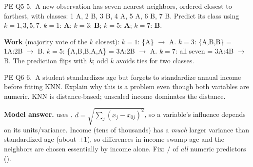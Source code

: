 \begin{qbox}{PE Q5}
5.~A new observation has seven nearest neighbors, ordered closest to farthest, with classes: 1 A, 2 B, 3 B, 4 A, 5 A, 6 B, 7 B. Predict its class using $k=1,3,5,7$.
\ans $k=1$: \textbf{A}; $k=3$: \textbf{B}; $k=5$: \textbf{A}; $k=7$: \textbf{B}.\par
\textbf{Work} (majority vote of the $k$ closest): $k=1$: \{A\} $\to$ A. $k=3$: \{A,B,B\} = 1A:2B $\to$ B. $k=5$: \{A,B,B,A,A\} = 3A:2B $\to$ A. $k=7$: all seven = 3A:4B $\to$ B. The prediction flips with $k$; odd $k$ avoids ties for two classes. 
\end{qbox}

\begin{qbox}{PE Q6}
6.~A student standardizes age but forgets to standardize annual income before fitting KNN. Explain why this is a problem even though both variables are numeric.
\ans KNN is distance-based; unscaled income dominates the distance.\par
\textbf{Model answer.}  uses , $d=\sqrt{\sum_j (x_j-x_{0j})^2}$, so a variable's influence depends on its units/variance. Income (tens of thousands) has a \emph{much} larger variance than standardized age (about $\pm1$), so differences in income swamp age and the neighbors are chosen essentially by income alone. Fix: / of \emph{all} numeric predictors (). 
\end{qbox}

